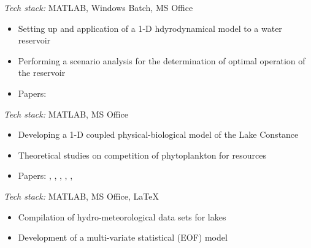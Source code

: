 \documentclass[
	a4paper,
]{fortysecondscv}
\begin{document}
\begin{cvtable}[1.0]
	{\href{https://www.ufz.de/en}{\color{pblue}{UFZ, Germany}}}
	{
	\textit{Tech stack:} MATLAB, Windows Batch, MS Office
	\begin{changemargin}{-45pt}{0pt}
	\begin{itemize}[topsep=0pt,itemsep=0pt,partopsep=0pt, parsep=0pt, leftmargin=*]
     \item Setting up and application of a 1-D hdyrodynamical model to a water reservoir
     \item Performing a scenario analysis for the determination of optimal operation of the reservoir
     \item Papers:
      \href{https://doi.org/10.1002/2013WR013520}{\color{pblue}{1}} %
    \end{itemize}
    \end{changemargin}  
    }
      
	{\href{https://www.uni-konstanz.de/}{\color{pblue}{Uni. Konstanz, Germany}}}
	{
	\textit{Tech stack:} MATLAB, MS Office
	\begin{changemargin}{-45pt}{0pt}
	\begin{itemize}[topsep=0pt,itemsep=0pt,partopsep=0pt, parsep=0pt, leftmargin=*]
     \item Developing a 1-D coupled physical-biological model of the Lake Constance
     \item Theoretical studies on competition of phytoplankton for resources
     \item Papers:
      \href{https://doi.org/10.1111/j.1365-2486.2009.02158.x}{\color{pblue}{1}}, %
      \href{https://doi.org/10.1016/j.jtbi.2012.01.044}{\color{pblue}{2}}, %
      \href{https://doi.org/10.1007/s12080-012-0164-2}{\color{pblue}{3}}, %
      \href{https://doi.org/10.1111/j.1600-0706.2012.20603.x}{\color{pblue}{4}}, %
      \href{https://doi.org/10.1007/s10750-013-1551-4}{\color{pblue}{5}}, %
      \href{https://doi.org/10.1890/14-0839.1}{\color{pblue}{6}} %
    \end{itemize}
    \end{changemargin}  
    }
      
	{\href{https://www.metu.edu.tr/}{\color{pblue}{METU, Turkey}}}
	{
	\textit{Tech stack:} MATLAB, MS Office, \LaTeX
	\begin{changemargin}{-45pt}{0pt}
	\begin{itemize}[topsep=0pt,itemsep=0pt,partopsep=0pt, parsep=0pt, leftmargin=*]
     \item Compilation of hydro-meteorological data sets for lakes
     \item Development of a multi-variate statistical (EOF) model
     \end{itemize}
    \end{changemargin}   
    }
    

\end{cvtable}
\end{document}
